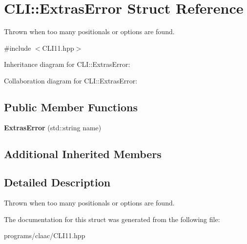 \hypertarget{struct_c_l_i_1_1_extras_error}{}\section{C\+LI\+:\+:Extras\+Error Struct Reference}
\label{struct_c_l_i_1_1_extras_error}


Thrown when too many positionals or options are found.  




{\ttfamily \#include $<$C\+L\+I11.\+hpp$>$}



Inheritance diagram for C\+LI\+:\+:Extras\+Error\+:


Collaboration diagram for C\+LI\+:\+:Extras\+Error\+:
\subsection*{Public Member Functions}
\begin{DoxyCompactItemize}
\item 
\mbox{\label{struct_c_l_i_1_1_extras_error_a2144fc68bb1b9d34a6e6a39f7aad361e}} 
{\bfseries Extras\+Error} (std\+::string name)
\end{DoxyCompactItemize}
\subsection*{Additional Inherited Members}


\subsection{Detailed Description}
Thrown when too many positionals or options are found. 

The documentation for this struct was generated from the following file\+:\begin{DoxyCompactItemize}
\item 
programs/claac/C\+L\+I11.\+hpp\end{DoxyCompactItemize}
